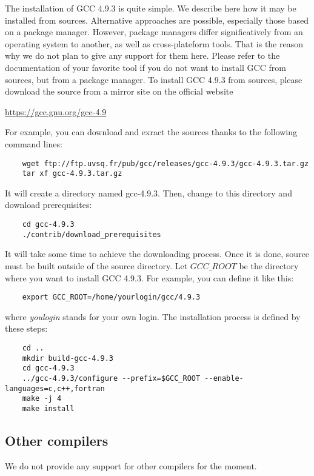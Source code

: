 The installation of GCC 4.9.3 is quite simple. We describe here how it may be installed from sources. Alternative approaches are possible, especially those based on a package manager. However, package managers differ significatively from an operating system to another, as well as cross-plateform tools. That is the reason why we do not plan to give any support for them here. Please refer to the documentation of your favorite tool if you do not want to install GCC from sources, but from a package manager. To install GCC 4.9.3 from sources, please download the source from a mirror site on the official website 
\begin{center}
	\url{https://gcc.gnu.org/gcc-4.9}
\end{center}
For example, you can download and exract the sources thanks to the following command lines:
\begin{verbatim}
	wget ftp://ftp.uvsq.fr/pub/gcc/releases/gcc-4.9.3/gcc-4.9.3.tar.gz
	tar xf gcc-4.9.3.tar.gz
\end{verbatim}
It will create a directory named gcc-4.9.3. Then, change to this directory and download prerequisites:
\begin{verbatim}
	cd gcc-4.9.3
	./contrib/download_prerequisites
\end{verbatim}
It will take some time to achieve the downloading process. Once it is done, source must be built outside of the source directory. Let $GCC\_ROOT$ be the directory where you want to install GCC 4.9.3. For example, you can define it like this:
\begin{verbatim}
	export GCC_ROOT=/home/yourlogin/gcc/4.9.3
\end{verbatim}
where \textit{youlogin} stands for your own login. The installation process is defined by these steps:
\begin{verbatim}
	cd ..
	mkdir build-gcc-4.9.3
	cd gcc-4.9.3
	../gcc-4.9.3/configure --prefix=$GCC_ROOT --enable-languages=c,c++,fortran
	make -j 4
	make install
\end{verbatim}




\subsection{Other compilers}

We do not provide any support for other compilers for the moment.
